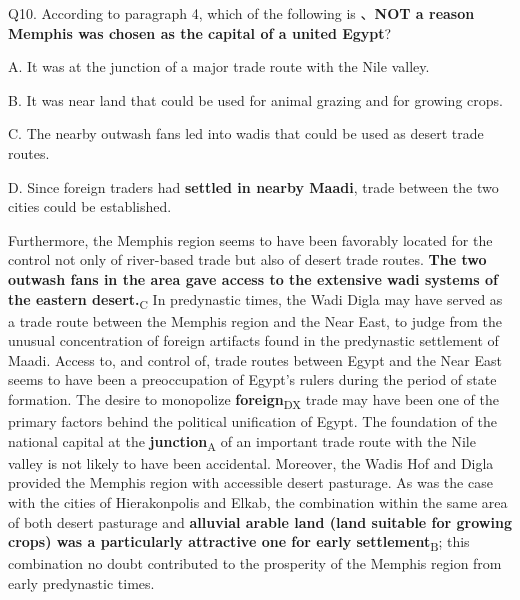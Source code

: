 \begin{blk}
    \begin{qst}
        Q10. According to paragraph 4, which of the following is 、\textbf{NOT a reason Memphis was chosen as the capital of a united Egypt}?
    \end{qst}

    \begin{chc}
        A. It was at the junction of a major trade route with the Nile valley.

        B. It was near land that could be used for animal grazing and for growing crops.

        C. The nearby outwash fans led into wadis that could be used as desert trade routes.

        D. Since foreign traders had \textbf{settled in nearby Maadi}, trade between the two cities could be established.
    \end{chc}

    \begin{psgq}
        Furthermore, the Memphis region seems to have been favorably located for the control not only of river-based trade but also of desert trade routes. \textbf{The two outwash fans in the area gave access to the extensive wadi systems of the eastern desert.}\textsubscript{C} In predynastic times, the Wadi Digla may have served as a trade route between the Memphis region and the Near East, to judge from the unusual concentration of foreign artifacts found in the predynastic settlement of Maadi. Access to, and control of, trade routes between Egypt and the Near East seems to have been a preoccupation of Egypt’s rulers during the period of state formation. The desire to monopolize \textbf{foreign}\textsubscript{DX} trade may have been one of the primary factors behind the political unification of Egypt. The foundation of the national capital at the \textbf{junction}\textsubscript{A} of an important trade route with the Nile valley is not likely to have been accidental. Moreover, the Wadis Hof and Digla provided the Memphis region with accessible desert pasturage. As was the case with the cities of Hierakonpolis and Elkab, the combination within the same area of both desert pasturage and \textbf{alluvial arable land (land suitable for growing crops) was a particularly attractive one for early settlement}\textsubscript{B}; this combination no doubt contributed to the prosperity of the Memphis region from early predynastic times.
    \end{psgq}


\end{blk}
